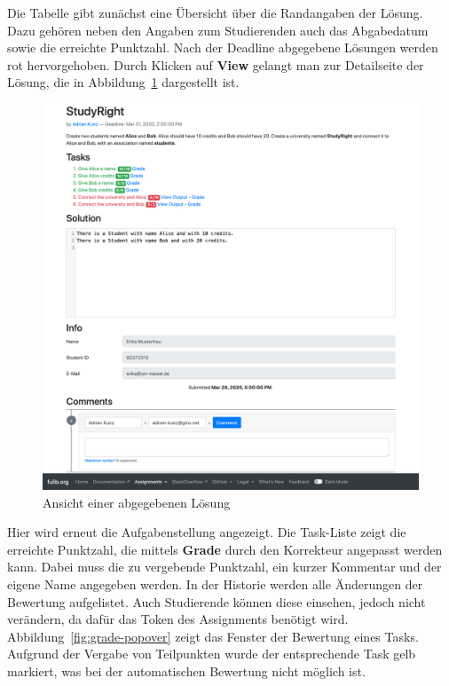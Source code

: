 Die Tabelle gibt zunächst eine Übersicht über die Randangaben der Lösung.
Dazu gehören neben den Angaben zum Studierenden auch das Abgabedatum sowie die erreichte Punktzahl.
Nach der Deadline abgegebene Lösungen werden rot hervorgehoben.
Durch Klicken auf \textbf{View} gelangt man zur Detailseite der Lösung, die in Abbildung~\ref{fig:solution} dargestellt ist.

\begin{figure}
    \centering
    \includegraphics[width=\textwidth]{chapter/fulib.org/img/solution.png}
    \caption{Ansicht einer abgegebenen Lösung}
    \label{fig:solution}
\end{figure}

Hier wird erneut die Aufgabenstellung angezeigt.
Die Task-Liste zeigt die erreichte Punktzahl, die mittels \textbf{Grade} durch den Korrekteur angepasst werden kann.
Dabei muss die zu vergebende Punktzahl, ein kurzer Kommentar und der eigene Name angegeben werden.
In der Historie werden alle Änderungen der Bewertung aufgelistet.
Auch Studierende können diese einsehen, jedoch nicht verändern, da dafür das Token des Assignments benötigt wird.
Abbildung~\ref{fig:grade-popover} zeigt das Fenster der Bewertung eines Tasks.
Aufgrund der Vergabe von Teilpunkten wurde der entsprechende Task gelb markiert, was bei der automatischen Bewertung nicht möglich ist.

